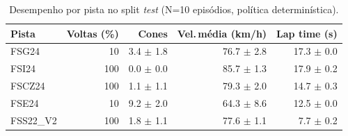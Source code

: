 \begin{table}[H]
\centering
\caption{Desempenho por pista no split \textit{test} (N=10 episódios, política determinística).}
\label{tab:per_track_test}
\begin{tabular}{lrrrr}
\toprule
\textbf{Pista} & \textbf{Voltas (\%)} & \textbf{Cones} & \textbf{Vel.\,m\'edia (km/h)} & \textbf{Lap time (s)} \\
\midrule
FSG24 & 10 & 3.4 $\pm$ 1.8 & 76.7 $\pm$ 2.8 & 17.3 $\pm$ 0.0 \\
FSI24 & 100 & 0.0 $\pm$ 0.0 & 85.7 $\pm$ 1.3 & 17.9 $\pm$ 0.2 \\
FSCZ24 & 100 & 1.1 $\pm$ 1.1 & 79.3 $\pm$ 2.0 & 14.7 $\pm$ 0.3 \\
FSE24 & 10 & 9.2 $\pm$ 2.0 & 64.3 $\pm$ 8.6 & 12.5 $\pm$ 0.0 \\
FSS22_V2 & 100 & 1.8 $\pm$ 1.1 & 77.6 $\pm$ 1.1 & 7.7 $\pm$ 0.2 \\
\bottomrule
\end{tabular}
\end{table}
